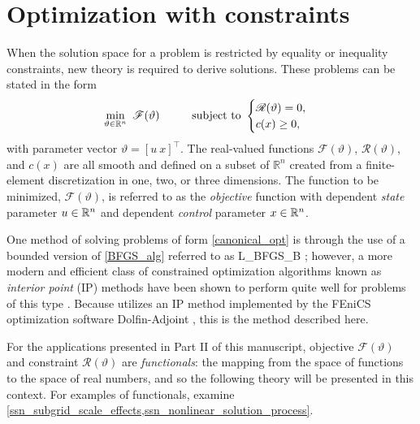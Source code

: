 
\chapter{Optimization with constraints} \label{ssn_optimization_with_constraints}

When the solution space for a problem is restricted by equality or inequality constraints, new theory is required to derive solutions.  These problems can be stated in the form \citep{nocedal_2000}
\begin{align}
  \label{canonical_opt}
  \min_{\vartheta \in \R^n}\ \mathscr{F}(\vartheta) \hspace{10mm} \text{subject to  }
  \begin{cases}
    \mathscr{R}(\vartheta) = 0, \\
    c(x) \geq 0,
  \end{cases}
\end{align}
with parameter vector $\vartheta = [u\ x]^\intercal$.  The real-valued functions $\mathscr{F}(\vartheta)$, $\mathscr{R}(\vartheta)$, and $c(x)$ are all smooth and defined on a subset of $\mathbb{R}^n$ created from a finite-element discretization in one, two, or three dimensions.  The function to be minimized, $\mathscr{F}(\vartheta)$, is referred to as the  \emph{objective} function with dependent  \emph{state} parameter $u \in \mathbb{R}^n$ and dependent \emph{control} parameter $x \in \mathbb{R}^n$.

One method of solving problems of form \cref{canonical_opt} is through the use of a bounded version of \cref{BFGS_alg} referred to as L\_BFGS\_B \citep{byrd_1995}; however, a more modern and efficient class of constrained optimization algorithms known as  \emph{interior point} (IP) methods have been shown to perform quite well for problems of this type \citep{nocedal_2000}.  Because \CSLVR utilizes an IP method implemented by the FEniCS optimization software Dolfin-Adjoint \citep{farrell_2013}, this is the method described here.

For the applications presented in Part II of this manuscript, objective $\mathscr{F}(\vartheta)$ and constraint $\mathscr{R}(\vartheta)$ are  \emph{functionals}: the mapping from the space of functions to the space of real numbers, and so the following theory will be presented in this context. For examples of functionals, examine \cref{ssn_subgrid_scale_effects,ssn_nonlinear_solution_process}.

